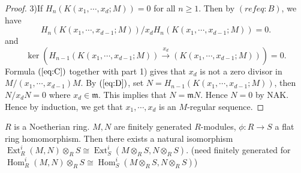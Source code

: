 \documentclass[cs4size]{article}
\newcommand{\frm}{\mathfrak{m}}
\newcommand{\ra}{\rightarrow}
\newcommand{\xr}{\xrightarrow}
\DeclareMathOperator{\Ext}{Ext}
\DeclareMathOperator{\Hom}{Hom}
\begin{document}
\begin{proof}
3)If $H_n(K(x_1,\cdots,x_d;M))=0$ for all $n\geq 1$. Then by $(ref{eq:B})$, we have
\begin{equation}
H_n(K(x_1,\cdots,x_{d-1};M))/x_dH_n(K(x_1,\cdots,x_{d-1};M))=0.\label{eq:C}
\end{equation}
and
\begin{equation}\label{eq:D}
\ker (H_{n-1}(K(x_1,\cdots,x_{d-1};M))\xr{x_d}(K(x_1,\cdots,x_{d-1};M)))=0.
\end{equation}
Formula $(\ref{eq:C})$ together with part 1) gives that $x_d$ is not a zero divisor in $M/(x_1,\cdots,x_{d-1})M$. By $(\ref{eq:D})$, set $N=H_{n-1}(K(x_1,\cdots,x_{d-1};M))$, then $N/x_dN=0$ where $x_d\in \frm$. This implies that $N=\frm N$. Hence $N=0$ by NAK. Hence by induction, we get that $x_1,\cdots,x_d$ is an $M$-regular sequence.
\end{proof}

$R$ is a Noetherian ring. $M,N$ are finitely generated $R$-modules, $\phi: R\ra S$ a flat ring homomorphism. Then there exists a natural isomorphism $\Ext_R^i(M,N)\otimes_RS\cong \Ext_S^i(M\otimes_RS,N\otimes_RS)$. (need finitely generated for $\Hom_R^i(M,N)\otimes_RS\cong \Hom_S^i(M\otimes_RS,N\otimes_RS)$)
\end{document}

